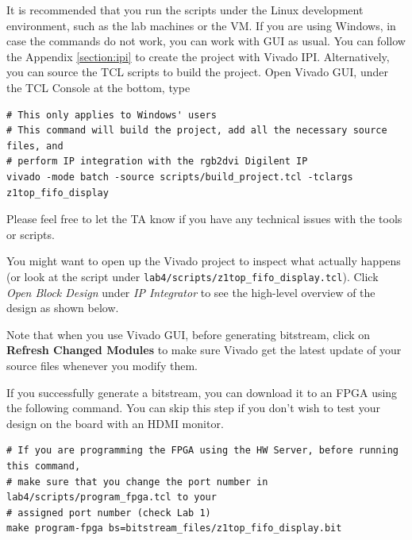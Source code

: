 \documentclass[11pt]{article}
\begin{document}
It is recommended that you run the scripts under the Linux development environment, such as the lab machines or the VM. If you are using Windows, in case the commands do not work, you can work with GUI as usual. You can follow the Appendix \ref{section:ipi} to create the project with Vivado IPI. Alternatively, you can source the TCL scripts to build the project. Open Vivado GUI, under the TCL Console at the bottom, type

\begin{verbatim}
# This only applies to Windows' users
# This command will build the project, add all the necessary source files, and
# perform IP integration with the rgb2dvi Digilent IP
vivado -mode batch -source scripts/build_project.tcl -tclargs z1top_fifo_display
\end{verbatim}

Please feel free to let the TA know if you have any technical issues with the tools or scripts.

You might want to open up the Vivado project to inspect what actually happens (or look at the script under \verb|lab4/scripts/z1top_fifo_display.tcl|). Click \emph{Open Block Design} under \emph{IP Integrator} to see the high-level overview of the design as shown below.

\begin{center}
\end{center}

Note that when you use Vivado GUI, before generating bitstream, click on \textbf{Refresh Changed Modules} to make sure Vivado get the latest update of your source files whenever you modify them.

If you successfully generate a bitstream, you can download it to an FPGA using the following command. You can skip this step if you don't wish to test your design on the board with an HDMI monitor.

\begin{verbatim}
# If you are programming the FPGA using the HW Server, before running this command,
# make sure that you change the port number in lab4/scripts/program_fpga.tcl to your
# assigned port number (check Lab 1)
make program-fpga bs=bitstream_files/z1top_fifo_display.bit
\end{verbatim}
\end{document}
